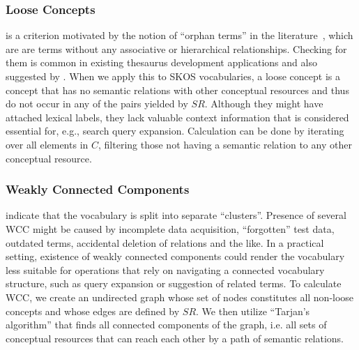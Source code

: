 \subsubsection{Loose Concepts} is a criterion motivated by the notion of ``orphan terms'' in the literature~\cite{Hedden2010}, which are are terms without any associative or hierarchical relationships. Checking for them is common in existing thesaurus development applications and also suggested by \cite{Z39.19:2005}. When we apply this to SKOS vocabularies, a loose concept is a concept that has no semantic relations with other conceptual resources and thus do not occur in any of the pairs yielded by $SR$. Although they might have attached lexical labels, they lack valuable context information that is considered essential for, e.g., search query expansion. Calculation can be done by iterating over all elements in $C$, filtering those not having a semantic relation to any other conceptual resource. 


\subsubsection{Weakly Connected Components} indicate that the vocabulary is split into separate ``clusters''. Presence of several WCC might be caused by incomplete data acquisition, ``forgotten'' test data, outdated terms, accidental deletion of relations and the like. In a practical setting, existence of weakly connected components could render the vocabulary less suitable for operations that rely on navigating a connected vocabulary structure, such as query expansion or suggestion of related terms. To calculate WCC, we create an undirected graph whose set of nodes constitutes all non-loose concepts and whose edges are defined by $SR$. We then utilize ``Tarjan’s algorithm''\cite{Hopcroft1973} that finds all connected components of the graph, i.e. all sets of conceptual resources that can reach each other by a path of semantic relations.

 


